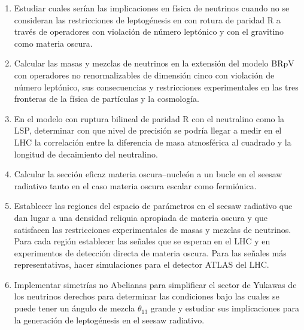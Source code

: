 \begin{enumerate}
\item
\begin{gravitinodm}
  Estudiar cuales serían las implicaciones en física de neutrinos
  cuando no se consideran las restricciones de leptogénesis en con
  rotura de paridad R a través de operadores con violación de número
  leptónico y con el gravitino como materia oscura.
\end{gravitinodm}

\item 
\begin{bbrpvlhc}
  Calcular las masas y mezclas de neutrinos en la extensión del modelo
  BRpV con operadores no renormalizables de dimensión cinco con
  violación de número leptónico, sus consecuencias y restricciones
  experimentales en las tres fronteras de la física de partículas y la
  cosmología.
\end{bbrpvlhc}
\label{item:bbrpvlhc1}
\item 
\begin{brpvlhc}  
  En el modelo con ruptura bilineal de paridad R con el neutralino
  como la LSP, determinar con que nivel de precisión se podría llegar
  a medir en el LHC la correlación entre la diferencia de masa
  atmosférica al cuadrado y la longitud de decaimiento del neutralino.
\end{brpvlhc}
\label{item:bbrpvlhc2}
\item 
\begin{darkmatter}
  Calcular la sección eficaz materia oscura--nucleón a un bucle en el
  seesaw radiativo tanto en el caso materia oscura escalar como
  fermiónica.
\end{darkmatter}

\item 
\begin{darkmatter}
  Establecer las regiones del espacio de parámetros en el seesaw
  radiativo que dan lugar a una densidad reliquia apropiada
  de materia oscura y que satisfacen las restricciones
  experimentales de masas y mezclas de neutrinos. Para cada región
  establecer las señales que se esperan en el LHC y en experimentos de
  detección directa de materia oscura.  Para las señales más
  representativas, hacer simulaciones para el detector ATLAS del LHC.
\end{darkmatter}
\label{item:darkmatter1}

\item 
\begin{darkmatter}
  Implementar simetrías no Abelianas para simplificar el sector de
  Yukawas de los neutrinos derechos para determinar las condiciones
  bajo las cuales se puede tener un ángulo de mezcla $\theta_{13}$
  grande y estudiar sus implicaciones para la generación de
  leptogénesis en el seesaw radiativo.
\end{darkmatter}
\label{item:darkmatter2}


\end{enumerate}
